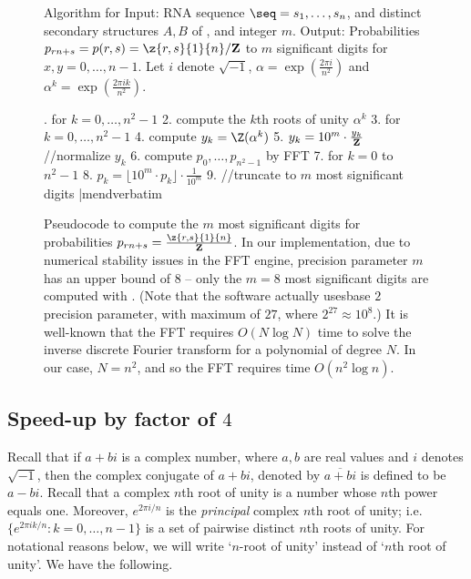 \begin{figure}[!ht]
\begin{small}
{\sc Algorithm} for \ffttwo\hfill\break
{\sc Input:} RNA sequence $\seq=s_1,\ldots,s_n$, and distinct secondary
structures $A,B$ of \seq, and integer $m$. \hfill\break
{\sc Output:} Probabilities $p_{rn+s} = p(r,s)=\z{r,s}{1}{n}/{\bf Z}$
to $m$ significant digits for $x,y=0,\ldots,n-1$.
Let $i$ denote $\sqrt{-1}$, $\alpha = \exp(\frac{2\pi i}{n^2})$ and
$\alpha^k = \exp(\frac{2\pi i k}{n^2})$.
\end{small}
\hfill\break
\smallskip
\begin{small}
.  for $k=0,\ldots,n^2-1$
 2.    compute the $k$th roots of unity $\alpha^k$
 3.  for $k=0,\ldots,n^2-1$
 4.    compute $y_k = \Z(\alpha^k)$
 5.    $y_k = 10^m \cdot \frac{y_k}{{\bf Z}}$ //normalize $y_k$
 6.  compute $p_0,\ldots,p_{n^2-1}$ by FFT
 7.  for $k=0$ to $n^2-1$
 8.    $p_k = \lfloor 10^m \cdot p_k \rfloor \cdot \frac{1}{10^m}$
 9.  //truncate to $m$ most significant digits
|mendverbatim
\end{small}
\caption{\small
Pseudocode to compute the $m$ most significant digits
for probabilities
$p_{rn+s} = \frac{\z{r,s}{1}{n}}{{\bf Z}}$. In our implementation,
due to numerical stability issues in the FFT engine, precision parameter
$m$ has an upper bound of $8$ -- only the $m=8$ most significant digits
are computed with \ffttwo.
(Note that the software actually usesbase $2$ precision parameter, with maximum of $27$, where $2^{27} \approx
10^8$.)
It is well-known that
the FFT requires $O(N \log N)$ time to solve the inverse discrete
Fourier transform for a polynomial of degree $N$. In our case,
$N=n^2$, and so the FFT requires time $O(n^2 \log n)$.
}
\label{fig:fftbor}
\end{figure}


\subsection{Speed-up by factor of $4$}
Recall that if $a+bi$ is a complex number, where $a,b$ are real values and $i$
denotes $\sqrt{-1}$, then the complex conjugate of $a+bi$, denoted by
$\overline{a+bi}$ is defined to be $a-bi$.  Recall that a complex $n$th
root of unity is a number whose $n$th power equals one. Moreover,
$e^{2 \pi i/n}$ is the {\em principal} complex $n$th root of unity; i.e.
$\{ e^{2 \pi i k/n} : k=0,\ldots,n-1 \}$ is a set of pairwise distinct
$n$th roots of unity. For notational reasons below, we will write
`$n$-root of unity' instead of `$n$th root of unity'.
We have the following.
\medskip

